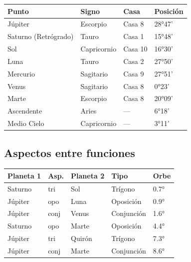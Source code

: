 \documentclass[11pt,a4paper]{article}
\begin{document}
\begin{center}
\begin{tabular}{llll}
\toprule
\textbf{Punto} & \textbf{Signo} & \textbf{Casa} & \textbf{Posición} \\
\midrule

Júpiter &
Escorpio &
Casa 8 &
28°47' \\

Saturno (Retrógrado) &
Tauro &
Casa 1 &
15°48' \\

Sol &
Capricornio &
Casa 10 &
16°30' \\

Luna &
Tauro &
Casa 2 &
27°50' \\

Mercurio &
Sagitario &
Casa 9 &
27°51' \\

Venus &
Sagitario &
Casa 8 &
0°23' \\

Marte &
Escorpio &
Casa 8 &
20°09' \\

Ascendente &
Aries &
--- &
6°18' \\

Medio Cielo &
Capricornio &
--- &
3°11' \\

\bottomrule
\end{tabular}
\end{center}

\vspace{0.8cm}

\subsection*{Aspectos entre funciones}

\begin{center}
\begin{tabular}{lllll}
  \toprule
  \textbf{Planeta 1} & \textbf{Asp.} & \textbf{Planeta 2} & \textbf{Tipo} & \textbf{Orbe} \\
  \midrule
  Saturno & tri & Sol & Trígono & 0.7° \\
  Júpiter & opo & Luna & Oposición & 0.9° \\
  Júpiter & conj & Venus & Conjunción & 1.6° \\
  Saturno & opo & Marte & Oposición & 4.4° \\
  Júpiter & tri & Quirón & Trígono & 7.3° \\
  Júpiter & conj & Marte & Conjunción & 8.6° \\
  \bottomrule
\end{tabular}
\end{center}
\end{document}
